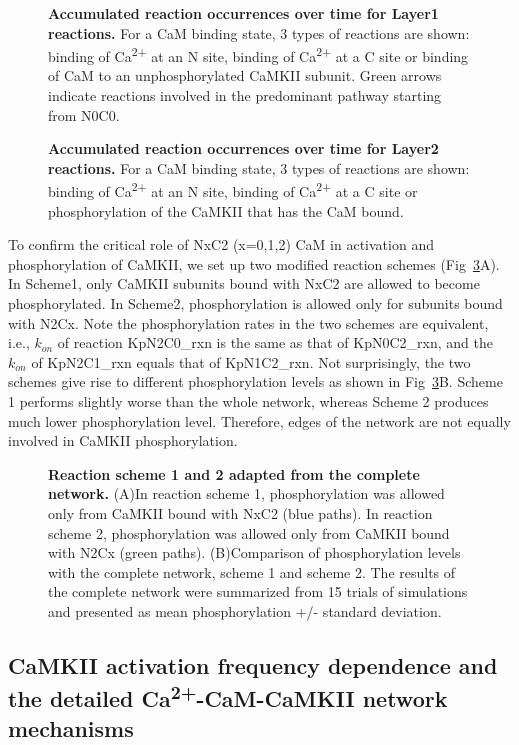 \documentclass[10pt,letterpaper]{article}
\begin{document}
\begin{figure}[!h]
	\caption{{\bf Accumulated reaction occurrences over time for Layer1 reactions.}
	For a CaM binding state, 3 types of reactions are shown: binding of Ca\textsuperscript{2+} at an N site, binding of Ca\textsuperscript{2+} at a C site or binding of CaM to an unphosphorylated CaMKII subunit. Green arrows indicate reactions involved in the predominant pathway starting from N0C0.
	}
\label{fig3}
\end{figure}

\begin{figure}[!h]
	\caption{{\bf Accumulated reaction occurrences over time for Layer2 reactions.}
	For a CaM binding state, 3 types of reactions are shown: binding of Ca\textsuperscript{2+} at an N site, binding of Ca\textsuperscript{2+} at a C site or phosphorylation of the CaMKII that has the CaM bound.
	}
\label{fig4}
\end{figure}

To confirm the critical role of NxC2 (x=0,1,2) CaM in activation and phosphorylation of CaMKII, we set up two modified reaction schemes (Fig~\ref{fig5}A). In Scheme1, only CaMKII subunits bound with NxC2 are allowed to become phosphorylated. In Scheme2, phosphorylation is allowed only for subunits bound with N2Cx. Note the phosphorylation rates in the two schemes are equivalent, i.e., $k_{on}$ of reaction KpN2C0\_rxn is the same as that of KpN0C2\_rxn, and the $k_{on}$ of KpN2C1\_rxn equals that of KpN1C2\_rxn. Not surprisingly, the two schemes give rise to different phosphorylation levels as shown in Fig~\ref{fig5}B. Scheme 1 performs slightly worse than the whole network, whereas Scheme 2 produces much lower phosphorylation level. Therefore, edges of the network are not equally involved in CaMKII phosphorylation. 

\begin{figure}[!h]
	\caption{{\bf Reaction scheme 1 and 2 adapted from the complete network.}
	(A)In reaction scheme 1, phosphorylation was allowed only from CaMKII bound with NxC2 (blue paths). In reaction scheme 2, phosphorylation was allowed only from CaMKII bound with N2Cx (green paths).
	(B)Comparison of phosphorylation levels with the complete network, scheme 1 and scheme 2. The results of the complete network were summarized from 15 trials of simulations and presented as mean phosphorylation +/- standard deviation.
	} 
\label{fig5}
\end{figure}

\subsection*{CaMKII activation frequency dependence and the detailed Ca\textsuperscript{2+}-CaM-CaMKII network mechanisms}
\end{document}
